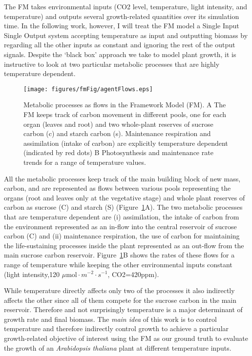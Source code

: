 The FM takes environmental inputs (CO2 level, temperature, light intensity, and
temperature) and outputs several growth-related quantities over its simulation
time. In the following work, however, I will treat the FM model a Single Input
Single Output system accepting temperature as input and outputting biomass by
regarding all the other inputs as constant and ignoring the rest of the output
signals. Despite the `black box' approach we take to model plant growth, it is
instructive to look at two particular metabolic processes that are highly
temperature dependent.

\begin{figure}[tb]
\centering
\texttt{[image: figures/fmFig/agentFlows.eps]}
\caption{Metabolic processes as flows in the Framework Model (FM). A The FM
  keeps track of carbon movement in different pools, one for each organ (leaves
  and root) and two whole-plant reserves of sucrose carbon (c) and starch carbon
  (s). Maintenance respiration and assimilation (intake of carbon) are
  explicitly temperature dependent (indicated by red dots) B Photosynthesis and
  maintenance rate trends for a range of temperature values.}
\label{fig:fm}
\end{figure}

All the metabolic processes keep track of the main building block of new mass,
carbon, and are represented as flows between various pools representing the
organs (root and leaves only at the vegetative stage) and whole plant reserves
of carbon as sucrose (C) and starch (S) (Figure~\ref{fig:fm}A). The two
metabolic processes that are temperature dependent are (i) assimilation, the
intake of carbon from the environment represented as an in-flow into the central
reservoir of sucrose carbon (C) and (ii) maintenance respiration, the use of
carbon for maintaining the life-sustaining processes inside the plant
represented as an out-flow from the main sucrose carbon
reservoir. Figure~\ref{fig:fm}B shows the rates of these flows for a range of
temperature while keeping the other environmental inputs constant (light
intensity,120 $\mu \mathrm{mol} \cdot m^{-2} \cdot s^{-1}$, CO2=420ppm).

While temperature directly affects only two of the processes it also indirectly
affects the other since all of them compete for the sucrose carbon in the main
reservoir. Therefore and not surprisingly temperature is a major determinant of
growth rate and final biomass. The \emph{main idea} of this work is to control
temperature and therefore indirectly control growth to achieve a particular
growth-related objective of interest using the FM as our ground truth to
evaluate the growth of an \textit{Arabidopsis thaliana} plant at different
temperature inputs.

